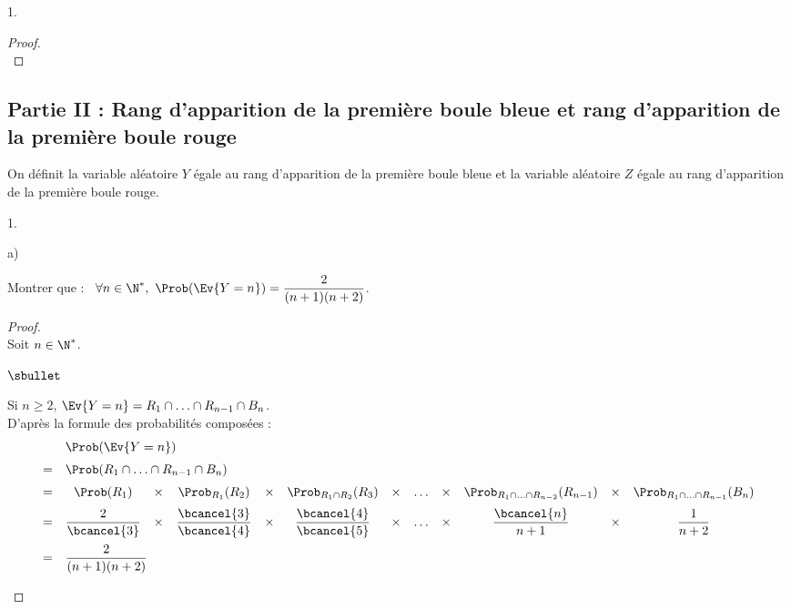 \documentclass[11pt]{article}%
\begin{document}
\begin{noliste}{1.}
\begin{proof}


    ~\\[-1.4cm]
  \end{proof}
\end{noliste}

\subsection*{Partie II : Rang d'apparition de la première boule bleue 
et rang d'apparition de la première boule rouge}

\noindent 
On définit la variable aléatoire $Y$ égale au rang d'apparition de la
première boule bleue et la variable aléatoire $Z$ égale au rang
d'apparition de la première boule rouge.

\begin{noliste}{1.}
  \setcounter{enumi}{2}
\item
  \begin{noliste}{a)}
  \item Montrer que : \ $\forall n \in \N^*, \ \Prob(\Ev{Y = n}) =
    \dfrac{2}{(n+1)(n+2)}$.

    \begin{proof}~\\
      Soit $n \in \N^*$.
      \begin{noliste}{$\sbullet$}
      \item Si $n \geq 2$, $\Ev{Y = n} = R_1 \cap \ldots \cap 
      R_{n-1} \cap B_n$.\\
        D'après la formule des probabilités composées :
        \[
        \begin{array}{cccccccccccc}
          & \multicolumn{11}{l}{\Prob(\Ev{Y = n})} \\[.2cm]
          = & \multicolumn{11}{l}{\Prob(R_1 \cap \ldots \cap R_{n-1}
            \cap B_n)} \\[.2cm] 
          = & \Prob(R_1) & \times & \Prob_{R_1}(R_2) & \times & 
	  \Prob_{R_1
            \cap R_2}(R_3) & \times & \ldots & \times & \Prob_{R_1 \cap 
	    \ldots
            \cap R_{n-2}}(R_{n-1}) & \times & \Prob_{R_1 \cap \ldots 
	    \cap
            R_{n-1}}(B_n) \\[.2cm]
          = & \dfrac{2}{\bcancel{3}} & \times &
          \dfrac{\bcancel{3}}{\bcancel{4}} & \times & 
          \dfrac{\bcancel{4}}{\bcancel{5}} & \times & \ldots &
          \times & \dfrac{\bcancel{n}}{n+1} & \times &
          \dfrac{1}{n+2} \\[.4cm]
          = & \multicolumn{11}{l}{\dfrac{2}{(n+1)(n+2)}}
        \end{array}         
        \]


\end{noliste}
\end{proof}
\end{noliste}
\end{noliste}
\end{document}

